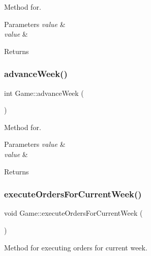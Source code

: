 Method for. 


\begin{DoxyParams}{Parameters}
{\em value} & \\
\hline
{\em value} & \\
\hline
\end{DoxyParams}
\begin{DoxyReturn}{Returns}

\end{DoxyReturn}
\mbox{\label{classGame_a8471ea91ed18fc2d289eb23747d11d39}} 
\subsubsection{\texorpdfstring{advance\+Week()}{advanceWeek()}}
{\footnotesize\ttfamily int Game\+::advance\+Week (\begin{DoxyParamCaption}{ }\end{DoxyParamCaption})}



Method for. 


\begin{DoxyParams}{Parameters}
{\em value} & \\
\hline
{\em value} & \\
\hline
\end{DoxyParams}
\begin{DoxyReturn}{Returns}

\end{DoxyReturn}
\mbox{\label{classGame_a907d3c04b949ddcf3d528a0c45122ba8}} 
\subsubsection{\texorpdfstring{execute\+Orders\+For\+Current\+Week()}{executeOrdersForCurrentWeek()}}
{\footnotesize\ttfamily void Game\+::execute\+Orders\+For\+Current\+Week (\begin{DoxyParamCaption}{ }\end{DoxyParamCaption})}



Method for executing orders for current week. 

